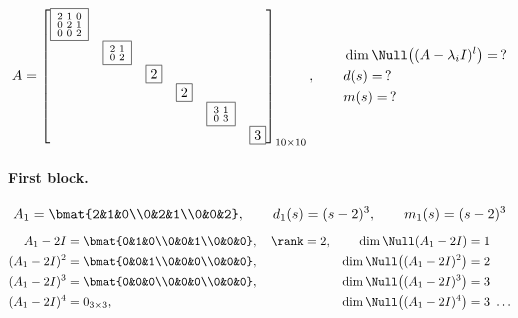 \begin{example}
\[
A=\begin{bmatrix}
\boxed{\begin{smallmatrix}2&1&0\\0&2&1\\0&0&2\end{smallmatrix}} & & & & & \\
& \boxed{\begin{smallmatrix}2&1\\0&2\end{smallmatrix}} & & & & \\
& & \boxed{2} & & & \\
& & & \boxed{2} & & \\
& & & & \boxed{\begin{smallmatrix}3&1\\0&3\end{smallmatrix}} & \\
& & & & & \boxed{3}
\end{bmatrix}_{10\times10},
\qquad
\begin{aligned}
&\dim\Null\big((A-\lambda_iI)^l\big)=\,?\\
&d(s)=\,?\\
&m(s)=\,?
\end{aligned}
\]

\paragraph{First block.}
\[
A_1=\bmat{2&1&0\\0&2&1\\0&0&2},\qquad d_1(s)=(s-2)^3,\qquad m_1(s)=(s-2)^3
\]
\begin{align*}
A_1-2I&=\bmat{0&1&0\\0&0&1\\0&0&0},\quad \rank=2, & \dim\Null(A_1-2I)&=1\\
(A_1-2I)^2&=\bmat{0&0&1\\0&0&0\\0&0&0}, & \dim\Null\big((A_1-2I)^2\big)&=2\\
(A_1-2I)^3&=\bmat{0&0&0\\0&0&0\\0&0&0}, & \dim\Null\big((A_1-2I)^3\big)&=3\\
(A_1-2I)^4&=0_{3\times3}, & \dim\Null\big((A_1-2I)^4\big)&=3\ \dots
\end{align*}


\end{example}
